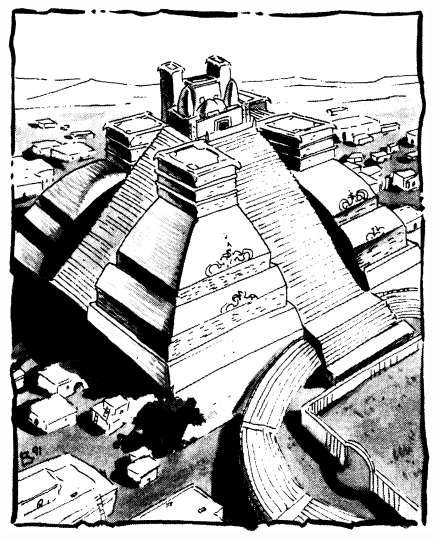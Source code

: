 \begin{figure}[t!]
\centering
\includegraphics[width=\columnwidth]{images/draj-1.png}
\end{figure}

